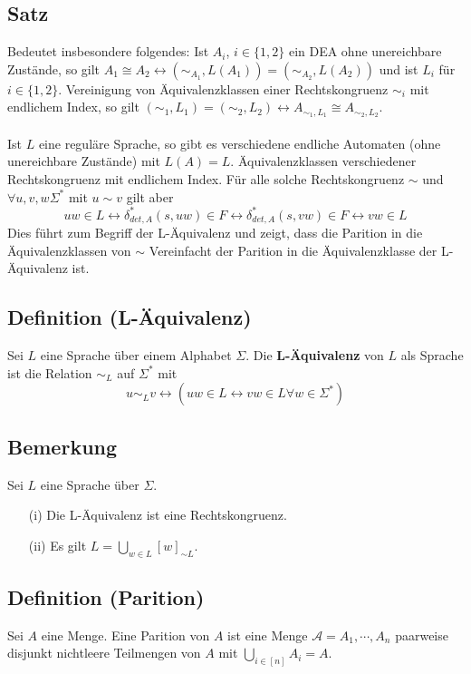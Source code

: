 \documentclass[a4paper,11pt]{article}
\begin{document}
\subsection{Satz} Bedeutet insbesondere folgendes: Ist $A_i$, $i \in \{1, 2\}$ ein DEA ohne unereichbare Zustände, so gilt $A_1 \cong  A_2 \leftrightarrow (\sim_{A_1}, L(A_1)) = (\sim_{A_2}, L(A_2))$ und ist $L_i$ für $i \in \{1, 2\}$. Vereinigung von Äquivalenzklassen einer Rechtskongruenz $\sim_i$ mit endlichem Index, so gilt $(\sim_1, L_1) = (\sim_2, L_2) \leftrightarrow A_{\sim_1,L_1} \cong A_{\sim_2,L_2}$. \\\\ Ist $L$ eine reguläre Sprache, so gibt es verschiedene endliche Automaten (ohne unereichbare Zustände) mit $L(A) = L$. Äquivalenzklassen verschiedener Rechtskongruenz mit endlichem Index. Für alle solche Rechtskongruenz $\sim$ und $\forall u, v, w \Sigma^*$ mit $u \sim v$ gilt aber \[uw \in L \leftrightarrow \delta^*_{det, A} (s, uw) \in F \leftrightarrow \delta^*_{det, A} (s, vw) \in F \leftrightarrow vw \in L\] Dies führt zum Begriff der L-Äquivalenz und zeigt, dass die Parition in die Äquivalenzklassen von $\sim$ Vereinfacht der Parition in die Äquivalenzklasse der L-Äquivalenz ist.

\subsection{Definition (L-Äquivalenz)} Sei $L$ eine Sprache über einem Alphabet $\Sigma$. Die \textbf{L-Äquivalenz} von $L$ als Sprache ist die Relation $\sim_L$ auf $\Sigma^*$ mit \[u \sim_L v \leftrightarrow (uw \in L \leftrightarrow vw \in L \forall w \in \Sigma^*)\] 

\subsection{Bemerkung} Sei $L$ eine Sprache über $\Sigma$. 
\begin{itemize}
  \item [(i)] Die L-Äquivalenz ist eine Rechtskongruenz.
  \item [(ii)] Es gilt $L = \bigcup \limits_{w \in L}[w]_{\sim L}$.
\end{itemize}

\subsection{Definition (Parition)} Sei $A$ eine Menge. Eine Parition von $A$ ist eine Menge $\mathcal{A} = {A_1, \cdots, A_n}$ paarweise disjunkt nichtleere Teilmengen von $A$ mit $\bigcup \limits_{i \in [n]} A_i = A$.
\end{document}
